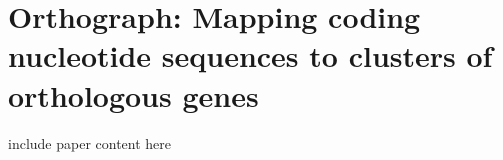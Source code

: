 
\chapter{Orthograph: Mapping coding nucleotide sequences to clusters of
orthologous genes}
\label{cha:orthograph}

include paper content here
